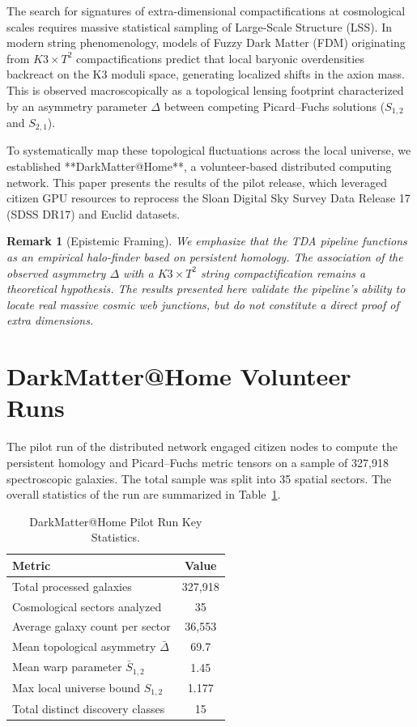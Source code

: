 \documentclass[aps,prd,twocolumn,nofootinbib,superscriptaddress,10pt]{revtex4-2}
\newtheorem{remark}{Remark}
\begin{document}
The search for signatures of extra-dimensional compactifications at cosmological scales requires massive statistical sampling of Large-Scale Structure (LSS). In modern string phenomenology, models of Fuzzy Dark Matter (FDM) originating from $K3 \times T^2$ compactifications predict that local baryonic overdensities backreact on the K3 moduli space, generating localized shifts in the axion mass. This is observed macroscopically as a topological lensing footprint characterized by an asymmetry parameter $\Delta$ between competing Picard--Fuchs solutions ($S_{1,2}$ and $S_{2,1}$).

To systematically map these topological fluctuations across the local universe, we established **DarkMatter@Home**, a volunteer-based distributed computing network. This paper presents the results of the pilot release, which leveraged citizen GPU resources to reprocess the Sloan Digital Sky Survey Data Release 17 (SDSS DR17) and Euclid datasets.

\begin{remark}[Epistemic Framing]
We emphasize that the TDA pipeline functions as an empirical halo-finder based on persistent homology. The association of the observed asymmetry $\Delta$ with a $K3 \times T^2$ string compactification remains a theoretical hypothesis. The results presented here validate the pipeline's ability to locate real massive cosmic web junctions, but do not constitute a direct proof of extra dimensions.
\end{remark}

\section{DarkMatter@Home Volunteer Runs}

The pilot run of the distributed network engaged citizen nodes to compute the persistent homology and Picard--Fuchs metric tensors on a sample of 327,918 spectroscopic galaxies. The total sample was split into 35 spatial sectors. The overall statistics of the run are summarized in Table~\ref{tab:run_stats}.

\begin{table}[h]
\centering
\caption{DarkMatter@Home Pilot Run Key Statistics.}
\label{tab:run_stats}
\begin{tabular}{lc}
\toprule
\textbf{Metric} & \textbf{Value} \\
\midrule
Total processed galaxies & 327,918 \\
Cosmological sectors analyzed & 35 \\
Average galaxy count per sector & 36,553 \\
Mean topological asymmetry $\bar{\Delta}$ & 69.7 \\
Mean warp parameter $\bar{S}_{1,2}$ & 1.45 \\
Max local universe bound $S_{1,2}$ & 1.177 \\
Total distinct discovery classes & 15 \\
\bottomrule
\end{tabular}
\end{table}
\end{document}
